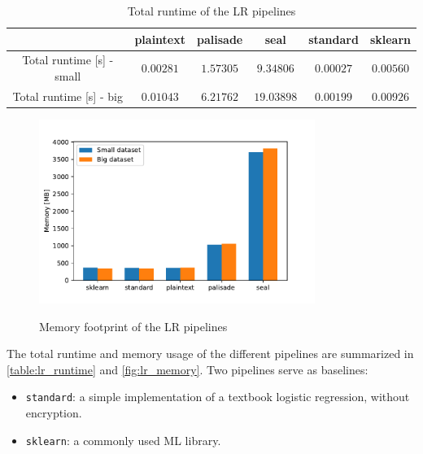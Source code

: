\documentclass[a4paper,11pt,oneside]{report}
\begin{document}
\begin{table}[h!]
  \begin{center}
    \caption{Total runtime of the LR pipelines}
    \label{table:lr_runtime}
    \begin{tabular}{ c c c c c c }
    \hline
     & plaintext & palisade & seal & standard & sklearn \\
    \hline
    Total runtime [s] - small & $0.00281$ & $1.57305$ & $9.34806$ & $0.00027$ & $0.00560$ \\
    Total runtime [s] - big & $0.01043$ & $6.21762$ & $19.03898$ & $0.00199$ & $0.00926$ \\
    \hline
    \end{tabular}
  \end{center}
\end{table}

\begin{figure}[h!]
  \centering
  \caption{Memory footprint of the LR pipelines}
  \includegraphics[width=0.8\textwidth]{figures/lr_mem.pdf}
  \label{fig:lr_memory}
\end{figure}

The total runtime and memory usage of the different pipelines are summarized in \autoref{table:lr_runtime} and \autoref{fig:lr_memory}. 
Two pipelines serve as baselines:
\begin{itemize}
  \item \texttt{standard}: a simple implementation of a textbook logistic regression, without encryption.
  \item \texttt{sklearn}: a commonly used ML library.
\end{itemize}
\end{document}
